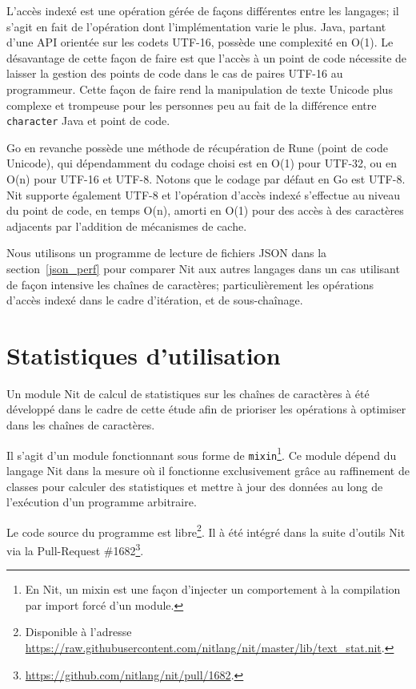 L'accès indexé est une opération gérée de façons différentes entre les
langages; il s'agit en fait de l'opération dont l'implémentation varie
le plus.
Java, partant d'une API orientée sur les codets UTF-16, possède une complexité
en O(1).
Le désavantage de cette façon de faire est que l'accès à un point de code
nécessite de laisser la gestion des points de code dans le cas de paires
UTF-16 au programmeur.
Cette façon de faire rend la manipulation de texte Unicode plus
complexe et trompeuse pour les personnes peu au fait de la différence entre
\texttt{character} Java et point de code.

Go en revanche possède une méthode de récupération de Rune (point de
code Unicode), qui dépendamment du codage choisi est en O(1) pour UTF-32,
ou en O(n) pour UTF-16 et UTF-8.
Notons que le codage par défaut en Go est UTF-8.
Nit supporte également UTF-8 et l'opération d'accès indexé s'effectue
au niveau du point de code, en temps O(n), amorti en O(1) pour des accès
à des caractères adjacents par l'addition de mécanismes de cache.

Nous utilisons un programme de lecture de fichiers JSON dans la section~\ref{json_perf} pour comparer
Nit aux autres langages dans un cas utilisant de façon intensive les
chaînes de caractères; particulièrement les opérations d'accès indexé dans
le cadre d'itération, et de sous-chaînage.

\section{Statistiques d'utilisation}\label{str_stats}

Un module Nit de calcul de statistiques sur les chaînes de caractères à été développé
dans le cadre de cette étude afin de prioriser les opérations à
optimiser dans les chaînes de caractères.

Il s'agit d'un module fonctionnant sous forme de
\texttt{mixin}\footnote{En Nit, un mixin est une façon d'injecter
un comportement à la compilation par import forcé d'un module.}.
Ce module dépend du langage Nit dans la mesure où il fonctionne exclusivement grâce au
raffinement de classes pour calculer des statistiques et mettre à jour des données au long de
l'exécution d'un programme arbitraire.

Le code source du programme est libre\footnote{Disponible à l'adresse \url{https://raw.githubusercontent.com/nitlang/nit/master/lib/text_stat.nit}.}.
Il à été intégré dans la suite d'outils Nit via la Pull-Request
\#1682\footnote{\url{https://github.com/nitlang/nit/pull/1682}.}.

